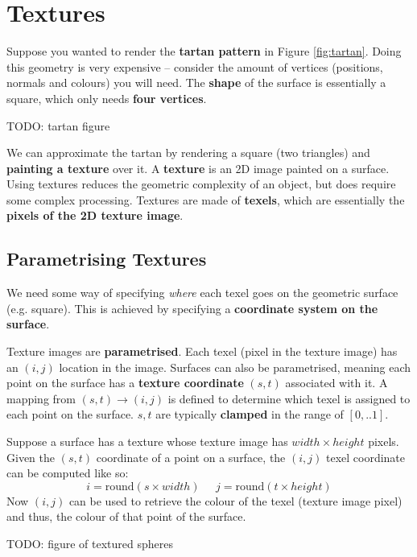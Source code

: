 \documentclass{article}
\begin{document}
\section{Textures}

Suppose you wanted to render the \textbf{tartan pattern} in Figure \ref{fig:tartan}. Doing this geometry is very expensive -- consider the amount of vertices (positions, normals and colours) you will need. The \textbf{shape} of the surface is essentially a square, which only needs \textbf{four vertices}.

TODO: tartan figure

We can approximate the tartan by rendering a square (two triangles) and \textbf{painting a texture} over it. A \textbf{texture} is an 2D image painted on a surface. Using textures reduces the geometric complexity of an object, but does require some complex processing. Textures are made of \textbf{texels}, which are essentially the \textbf{pixels of the 2D texture image}.

\subsection{Parametrising Textures}

We need some way of specifying \textit{where} each texel goes on the geometric surface (e.g. square). This is achieved by specifying a \textbf{coordinate system on the surface}.

Texture images are \textbf{parametrised}. Each texel (pixel in the texture image) has an $(i,j)$ location in the image. Surfaces can also be parametrised, meaning each point on the surface has a \textbf{texture coordinate} $(s, t)$ associated with it. A mapping from $(s, t) \rightarrow (i, j)$ is defined to determine which texel is assigned to each point on the surface. $s,t$ are typically \textbf{clamped} in the range of $[0,..1]$.

Suppose a surface has a texture whose texture image has $width \times height$ pixels. Given the $(s, t)$ coordinate of a point on a surface, the $(i, j)$ texel coordinate can be computed like so:
\begin{equation}
	i = \text{round}(s \times width) \;\;\;\;\;
	j = \text{round}(t \times height)
	\label{eq:texture-coord}
\end{equation}
Now $(i, j)$ can be used to retrieve the colour of the texel (texture image pixel) and thus, the colour of that point of the surface.

TODO: figure of textured spheres
\end{document}
